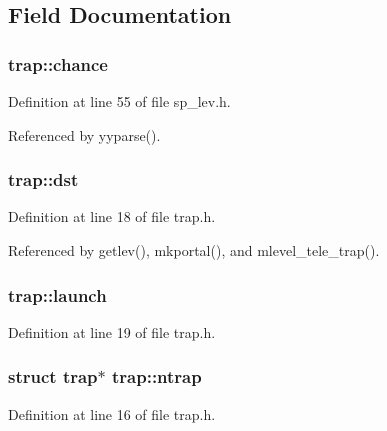 \subsection{Field Documentation}
\hypertarget{structtrap_a641c9896c51efde6d757cc1903209c98}{
\subsubsection[{chance}]{ trap\+::chance}}\label{structtrap_a641c9896c51efde6d757cc1903209c98}


Definition at line 55 of file sp\+\_\+lev.\+h.



Referenced by yyparse().

\hypertarget{structtrap_a7f0184c96889b0dfba889dbb18a06828}{
\subsubsection[{dst}]{ trap\+::dst}}\label{structtrap_a7f0184c96889b0dfba889dbb18a06828}


Definition at line 18 of file trap.\+h.



Referenced by getlev(), mkportal(), and mlevel\+\_\+tele\+\_\+trap().

\hypertarget{structtrap_acac0e6caed6e2b539423bef3e0ff5a87}{
\subsubsection[{launch}]{ trap\+::launch}}\label{structtrap_acac0e6caed6e2b539423bef3e0ff5a87}


Definition at line 19 of file trap.\+h.

\hypertarget{structtrap_aef8ea4650dce701fde7f7f3e1310c892}{
\subsubsection[{ntrap}]{\setlength{\rightskip}{0pt plus 5cm}struct {\bf trap}$\ast$ trap\+::ntrap}}\label{structtrap_aef8ea4650dce701fde7f7f3e1310c892}


Definition at line 16 of file trap.\+h.



